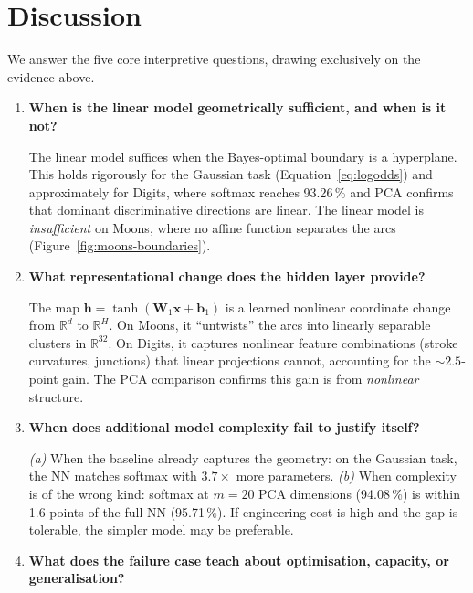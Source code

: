 \documentclass[sigconf,screen,nonacm]{acmart}
\newcommand{\R}{\mathbb{R}}
\newcommand{\1}{\mathbf{1}}
\newcommand{\tanhact}{\operatorname{tanh}}
\newcommand{\vx}{\mathbf{x}}
\newcommand{\vh}{\mathbf{h}}
\newcommand{\vbone}{\mathbf{b}_1}
\newcommand{\mWone}{\mathbf{W}_1}
\begin{document}
\section{Discussion}
\label{sec:discussion}

We answer the five core interpretive questions, drawing exclusively on the
evidence above.

\begin{enumerate}[leftmargin=*]

\item \textbf{When is the linear model geometrically sufficient, and when is it
not?}

The linear model suffices when the Bayes-optimal boundary is a hyperplane.
This holds rigorously for the Gaussian task (Equation~\ref{eq:logodds}) and
approximately for Digits, where softmax reaches 93.26\,\% and PCA confirms
that dominant discriminative directions are linear.  The linear model is
\emph{insufficient} on Moons, where no affine function separates the arcs
(Figure~\ref{fig:moons-boundaries}).

\item \textbf{What representational change does the hidden layer provide?}

The map $\vh{=}\tanhact(\mWone\vx{+}\vbone)$ is a learned nonlinear coordinate
change from $\R^d$ to $\R^H$.  On Moons, it ``untwists'' the arcs into linearly
separable clusters in $\R^{32}$.  On Digits, it captures nonlinear feature
combinations (stroke curvatures, junctions) that linear projections cannot,
accounting for the ${\sim}2.5$-point gain.  The PCA comparison confirms this
gain is from \emph{nonlinear} structure.

\item \textbf{When does additional model complexity fail to justify itself?}

\emph{(a)} When the baseline already captures the geometry: on the Gaussian
task, the NN matches softmax with $3.7\times$ more parameters.
\emph{(b)} When complexity is of the wrong kind: softmax at $m{=}20$ PCA
dimensions (94.08\,\%) is within 1.6 points of the full NN (95.71\,\%).
If engineering cost is high and the gap is tolerable, the simpler model may
be preferable.

\item \textbf{What does the failure case teach about optimisation, capacity, or
generalisation?}


\end{enumerate}
\end{document}
